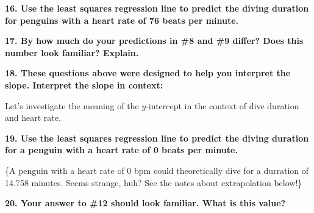 \documentclass[
  letterpaper,
  DIV=11,
  numbers=noendperiod]{scrartcl}
\begin{document}
\vspace{0.5cm}

\textbf{16. Use the least squares regression line to predict the diving
duration for penguins with a heart rate of 76 beats per minute.}


\vspace{0.5cm}

\textbf{17. By how much do your predictions in \#8 and \#9 differ? Does
this number look familiar? Explain.}


\vspace{0.5cm}

\textbf{18. These questions above were designed to help you interpret
the slope. Interpret the slope in context:}


\vspace{0.5cm}


Let's investigate the meaning of the \(y\)-intercept in the context of
dive duration and heart rate.

\textbf{19. Use the least squares regression line to predict the diving
duration for a penguin with a heart rate of 0 beats per minute.}


\{A penguin with a heart rate of 0 bpm could theoretically dive for a
durration of 14.758 minutes. Seems strange, huh? See the notes about
extrapolation below!\}

\vspace{0.5cm}

\textbf{20. Your answer to \#12 should look familiar. What is this
value?}
\end{document}
